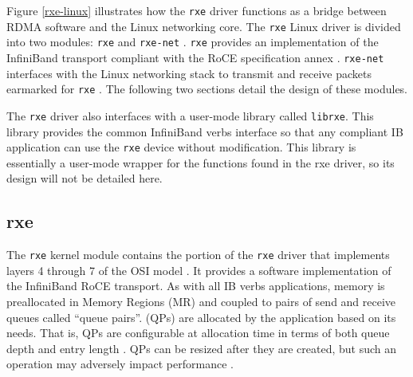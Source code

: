 \documentclass[11pt]{book}
\begin{document}
Figure \ref{rxe-linux} illustrates how the \verb;rxe; driver functions as a bridge between
RDMA software and the Linux networking core.  The \verb;rxe; Linux driver is divided into
two modules: \verb;rxe; and \verb;rxe-net; \cite{pearson-10}.  \verb;rxe; provides an
implementation of the InfiniBand transport compliant with the RoCE specification annex
\cite{InfiniBandTARoCE-10}.  \verb;rxe-net; interfaces with the Linux networking stack to
transmit and receive packets earmarked for \verb;rxe; \cite{pearson-10}.  The following two
sections detail the design of these modules.

The \verb;rxe; driver also interfaces with a user-mode library called \verb;librxe;.  This
library provides the common InfiniBand verbs interface so that any compliant IB
application can use the \verb;rxe; device without modification.  This library is
essentially a user-mode wrapper for the functions found in the rxe driver, so its design
will not be detailed here.

\subsection{rxe}\label{rxe}


The \verb;rxe; kernel module contains the portion of the \verb;rxe; driver that implements
layers 4 through 7 of the OSI model \cite{}.  It provides a software implementation of the
InfiniBand RoCE transport.  As with all IB verbs applications, memory is preallocated in
Memory Regions (MR) and coupled to pairs of send and receive queues called ``queue
pairs''.  (QPs) are allocated by the application based on its needs.  That is, QPs are
configurable at allocation time in terms of both queue depth and entry length
\cite{InfiniBandTARoCE-10,InfiniBandTABase-07}.  QPs can be resized after they are
created, but such an operation may adversely impact performance
\cite{InfiniBandTARoCE-10}.
\end{document}
